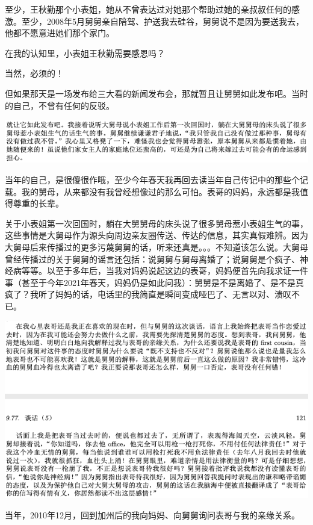 \documentclass[9pt, b5paper]{article}
\begin{document}
至少，王秋勤那个小表姐，她从不曾表达过对她那个帮助过她的亲叔叔任何的感激。至少，2008年5月舅舅亲自陪驾、护送我去硅谷，舅舅说不是因为要送我去，他都不愿意进她们那个家门。

在我的认知里，小表姐王秋勤需要感恩吗？

当然，必须的！ 

但如果那天是一场发布给三大看的新闻发布会，那就暂且让舅舅如此发布吧。当时的自己，不曾有任何的反驳。

\begin{center}
\includegraphics[width=.9\linewidth]{./pic/p1p120-7.png}
\end{center}

当年的自己，是很傻很作哦，至少今年春天我再回去读当年自己传记中的那些个记载。我的舅母，从来都没有我曾经想像过的那么可怕。表哥的妈妈，永远都是我值得尊重的长辈。

关于小表姐第一次回国时，躺在大舅舅母的床头说了很多舅母惹小表姐生气的事，这些事情是大舅母作为源头向周边亲友圈传送、传达的信息，其实真假难辨。因为大舅母后来传播过的更多污蔑舅舅的话，听来还真是。。。不知道该怎么说。大舅母曾经传播过的关于舅舅的谣言还包括：说舅舅与舅母离婚了；说舅舅是个疯子、神经病等等。以至于多年后，当我对妈妈说起这边的表哥，妈妈便首先向我求证一件事（甚至于今年2021年春天，妈妈仍是如此问我）：舅舅是不是离婚了、是不是真疯了？我听了妈妈的话，电话里的我简直是瞬间变成哑巴了、无言以对、溃叹不已。 

\begin{center}
\includegraphics[width=.9\linewidth]{./pic/p1p120-8.png}
\end{center}

当年，2010年12月，回到加州后的我向妈妈、向舅舅询问表哥与我的亲缘关系。 
\end{document}
